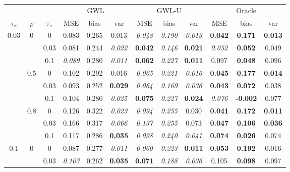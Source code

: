 \documentclass[authoryear, review, 11pt]{elsarticle}
\begin{document}
\begin{table}[ht]
\begin{center}
\begin{tabular}{ccc | ccc | ccc | ccc }
&&&\multicolumn{3}{c}{GWL}&\multicolumn{3}{c}{GWL-U}&\multicolumn{3}{c}{Oracle}\\$\tau_x$ & $\rho$ & $\tau_\sigma$ & MSE & bias & var &  MSE & bias & var &  MSE & bias & var\\   \hline
\multirow{9}{*}{0.03} & \multirow{3}{*}{0} & 0 & 0.083 & 0.265 & 0.013 & \emph{0.048} & \emph{0.190} & \emph{0.013} & \textbf{0.042} & \textbf{0.171} & \textbf{0.013} \\ 
 &  & 0.03 &   0.081 & 0.244 & \emph{0.022} & \textbf{0.042} & \emph{0.146} & \textbf{0.021} & \emph{0.052} & \textbf{0.052} & 0.049 \\ 
 &  & 0.1 &   \emph{0.089} & 0.280 & \emph{0.011} & \textbf{0.062} & \emph{0.227} & \textbf{0.011} & 0.097 & \textbf{0.048} & 0.096 \\ \cline{2-12}
 & \multirow{3}{*}{0.5} & 0 &   0.102 & 0.292 & 0.016 & \emph{0.065} & \emph{0.221} & \emph{0.016} & \textbf{0.045} & \textbf{0.177} & \textbf{0.014} \\ 
 &  & 0.03 &   0.093 & 0.252 & \textbf{0.029} & \emph{0.064} & \emph{0.169} & \emph{0.036} & \textbf{0.043} & \textbf{0.072} & 0.038 \\ 
 &  & 0.1 &   0.104 & 0.280 & \emph{0.025} & \textbf{0.075} & \emph{0.227} & \textbf{0.024} & \emph{0.076} & \textbf{-0.002} & 0.077 \\ \cline{2-12}
 & \multirow{3}{*}{0.8} & 0 &   0.126 & 0.322 & \emph{0.023} & \emph{0.094} & \emph{0.255} & 0.030 & \textbf{0.041} & \textbf{0.172} & \textbf{0.011} \\ 
 &  & 0.03 &   0.166 & 0.317 & \emph{0.066} & \emph{0.137} & \emph{0.255} & 0.073 & \textbf{0.047} & \textbf{0.106} & \textbf{0.036} \\ 
 &  & 0.1 &   0.117 & 0.286 & \textbf{0.035} & \emph{0.098} & \emph{0.240} & \emph{0.041} & \textbf{0.074} & \textbf{0.026} & 0.074 \\ \cline{1-12}
\multirow{9}{*}{0.1} & \multirow{3}{*}{0} & 0 &   0.087 & 0.277 & \emph{0.011} & \emph{0.060} & \emph{0.223} & \textbf{0.011} & \textbf{0.053} & \textbf{0.192} & 0.016 \\ 
 &  & 0.03 &   \emph{0.103} & 0.262 & \textbf{0.035} & \textbf{0.071} & \emph{0.188} & \emph{0.036} & 0.105 & \textbf{0.098} & 0.097 \\ 

\end{tabular}
\end{center}
\end{table}
\end{document}

